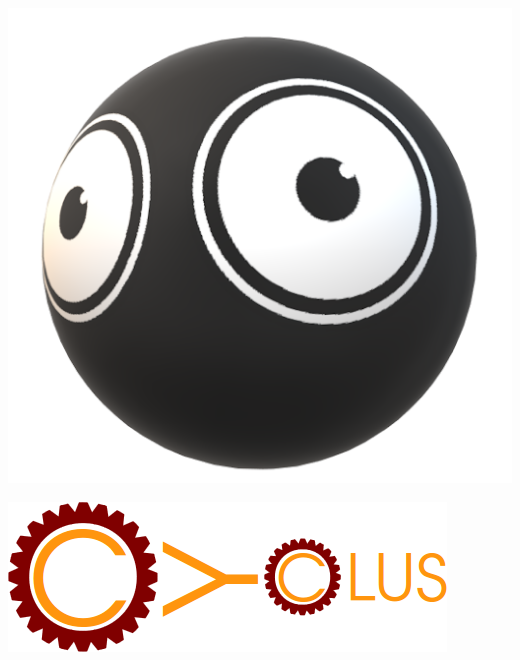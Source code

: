 {\begin{center}
\begin{tcolorbox}[colback=white, colframe=black, width=.9\linewidth, height=.25\linewidth, boxrule=1pt]
{\begin{minipage}{.2\linewidth}
                \vspace{10pt}
            \end{minipage}
            \begin{minipage}{.2\linewidth}
                \includegraphics[width=.8\linewidth]{img/ghastly.png}
            \end{minipage}
            \begin{minipage}{.2\linewidth}
                \includegraphics[width=\linewidth]{img/cyclus.png}
                \newline\par\vspace{-0.25em}
                \textcolor{altgeldorange!100}{\textbf{}}\\\vspace{-15pt}
            \end{minipage}
        }
    \end{tcolorbox}


\end{center}}
